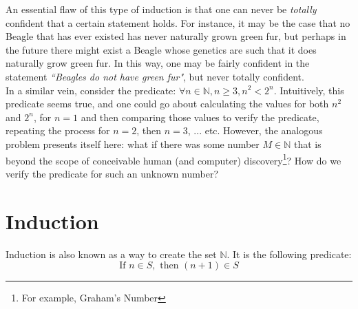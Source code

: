 \documentclass[10pt,a4paper,fleqn]{article}
\begin{document}
	An essential flaw of this type of induction is that one can never be \emph{totally} confident that a certain statement holds. For instance, it may be the case that no Beagle that has ever existed has never naturally grown green fur, but perhaps in the future there might exist a Beagle whose genetics are such that it does naturally grow green fur. In this way, one may be fairly confident in the statement \emph{``Beagles do not have green fur"}, but never totally confident. \\
	
	 In a similar vein, consider the predicate: $\forall n \in \mathbb{N}, n \geq 3, n^2 < 2^n$. Intuitively, this predicate seems true, and one could go about calculating the values for both $n^2$ and $2^n$, for $n = 1$ and then comparing those values to verify the predicate, repeating the process for $n=2$, then $n=3$, ... etc. However, the analogous problem presents itself here: what if there was some number $M \in \mathbb{N}$ that is beyond the scope of conceivable human (and computer) discovery\footnote{For example, Graham's Number}? How do we verify the predicate for such an unknown number?
	 
	\section{Induction}
		Induction is also known as a way to create the set $\mathbb{N}$. It is the following predicate: $$\text{If } n \in S, \text{ then } (n+1) \in S$$	
	\newpage
	
\end{document}
